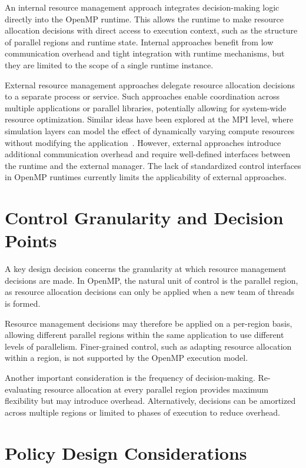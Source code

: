 An internal resource management approach integrates decision-making logic directly into the OpenMP runtime. This allows the runtime to make resource allocation decisions with direct access to execution context, such as the structure of parallel regions and runtime state. Internal approaches benefit from low communication overhead and tight integration with runtime mechanisms, but they are limited to the scope of a single runtime instance.

External resource management approaches delegate resource allocation decisions to a separate process or service. Such approaches enable coordination across multiple applications or parallel libraries, potentially allowing for system-wide resource optimization. Similar ideas have been explored at the MPI level, where simulation layers can model the effect of dynamically varying compute resources without modifying the application~\parencite{fecht_simulation_nodate}. However, external approaches introduce additional communication overhead and require well-defined interfaces between the runtime and the external manager. The lack of standardized control interfaces in OpenMP runtimes currently limits the applicability of external approaches.

\section{Control Granularity and Decision Points}

A key design decision concerns the granularity at which resource management decisions are made. In OpenMP, the natural unit of control is the parallel region, as resource allocation decisions can only be applied when a new team of threads is formed.

Resource management decisions may therefore be applied on a per-region basis, allowing different parallel regions within the same application to use different levels of parallelism. Finer-grained control, such as adapting resource allocation within a region, is not supported by the OpenMP execution model.

Another important consideration is the frequency of decision-making. Re-evaluating resource allocation at every parallel region provides maximum flexibility but may introduce overhead. Alternatively, decisions can be amortized across multiple regions or limited to phases of execution to reduce overhead.

\section{Policy Design Considerations}

